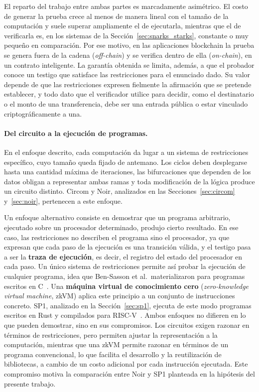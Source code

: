 El reparto del trabajo entre ambas partes es marcadamente asimétrico. El costo de generar la
prueba crece al menos de manera lineal con el tamaño de la computación y suele superar ampliamente
el de ejecutarla, mientras que el de verificarla es, en los sistemas de la
Sección~\ref{sec:snarks_starks}, constante o muy pequeño en comparación. Por ese motivo, en las
aplicaciones blockchain la prueba se genera fuera de la cadena (\textit{off-chain}) y se verifica
dentro de ella (\textit{on-chain}), en un contrato inteligente. La garantía obtenida se limita, además, a que el
probador conoce un testigo que satisface las restricciones para el enunciado dado. Su valor
depende de que las restricciones expresen fielmente la afirmación que se pretende establecer, y
todo dato que el verificador utilice para decidir, como el destinatario o el monto de una
transferencia, debe ser una entrada pública o estar vinculado criptográficamente a una.

\paragraph{Del circuito a la ejecución de programas.} En el enfoque descrito, cada computación
da lugar a un sistema de restricciones específico, cuyo tamaño queda fijado de antemano. Los
ciclos deben desplegarse hasta una cantidad máxima de iteraciones, las bifurcaciones que dependen
de los datos obligan a representar ambas ramas y toda modificación de la lógica produce un
circuito distinto. Circom y Noir, analizados en las Secciones~\ref{sec:circom}
y~\ref{sec:noir}, pertenecen a este enfoque.

Un enfoque alternativo consiste en demostrar que un programa arbitrario, ejecutado sobre un
procesador determinado, produjo cierto resultado. En ese caso, las restricciones no describen el
programa sino el procesador, ya que expresan que cada paso de la ejecución es una transición
válida, y el testigo pasa a ser la \textbf{traza de ejecución}, es decir, el registro del estado
del procesador en cada paso. Un único sistema de restricciones permite así probar la ejecución de
cualquier programa, idea que Ben-Sasson et al.\ materializaron para programas escritos en
C~\cite{bensasson2013snarks}. Una \textbf{máquina virtual de conocimiento cero}
(\textit{zero-knowledge virtual machine}, zkVM) aplica este principio a un conjunto de
instrucciones concreto. SP1, analizado en la Sección~\ref{sec:sp1}, ejecuta de este modo
programas escritos en Rust y compilados para RISC-V~\cite{succinctsp1}. Ambos enfoques no
difieren en lo que pueden demostrar, sino en sus compromisos. Los circuitos exigen razonar en
términos de restricciones, pero permiten ajustar la representación a la computación, mientras
que una zkVM permite razonar en términos de un programa convencional, lo que facilita el
desarrollo y la reutilización de bibliotecas, a cambio de un costo adicional por cada instrucción
ejecutada. Este compromiso motiva la
comparación entre Noir y SP1 planteada en la hipótesis del presente trabajo.

